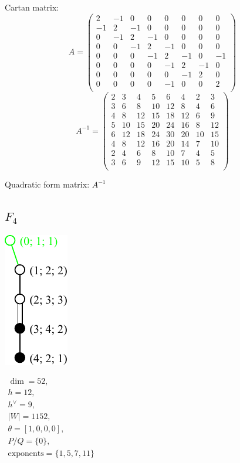 \documentclass[12pt]{article}
\newcommand{\hc}{h^{\vee}}
\begin{document}
Cartan matrix:
\[
A=\left(
\begin{array}{cccccccc}
 2 &-1& 0& 0& 0& 0 & 0 &0   \\
 -1& 2&-1& 0& 0& 0 & 0 &0   \\
 0 &-1& 2&-1& 0& 0 & 0 & 0 \\
 0 &0 &-1& 2&-1& 0 & 0 & 0 \\
 0 &0 &0 &-1& 2&-1 & 0 & -1\\
 0 &0 &0 &0 &-1& 2 &-1 & 0 \\
 0 &0 &0 & 0 & 0&-1& 2 & 0\\
 0 &0 &0 & 0 &-1& 0& 0 & 2\\
\end{array}
\right)\]
\[
A^{-1}=
\left(
\begin{array}{cccccccc}
   2& 3& 4& 5& 6& 4& 2& 3\\
   3& 6& 8&10&12& 8& 4& 6\\
   4& 8&12&15&18&12& 6& 9\\
   5&10&15&20&24&16& 8&12\\
   6&12&18&24&30&20&10&15\\
   4& 8&12&16&20&14& 7&10\\
   2& 4& 6& 8&10& 7& 4& 5\\
   3& 6& 9&12&15&10& 5& 8\\
\end{array}
\right)
\]

Quadratic form matrix: $A^{-1}$

%
%
\newpage
%
\subsection*{$F_4$}
\parbox{8cm}{\includegraphics{lie_F4.pdf}}
$
\begin{array}{l}
 \dim = 52, \\
  h= 12,\\
 \hc= 9,\\
 |W|=1152,\\
 \theta=[1,0,0,0],\\
 P/Q=\{0\},\\
 \text{exponents}={\{1,5,7,11\}}
\end{array}
$
\end{document}
